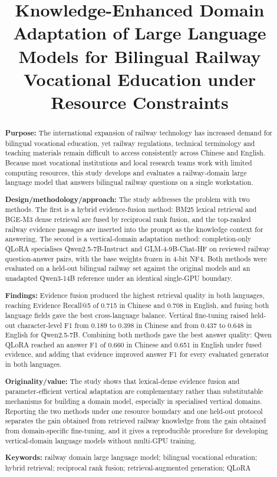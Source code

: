 \documentclass{article}
\author{}
\title{Knowledge-Enhanced Domain Adaptation of Large Language Models for Bilingual Railway Vocational Education under Resource Constraints}
\date{}
\begin{document}
\maketitle

\providecommand{\tightlist}{%
  \setlength{\itemsep}{0pt}\setlength{\parskip}{0pt}}

\begin{abstract}

\textbf{Purpose:} The international expansion of railway technology has increased demand for bilingual vocational education, yet railway regulations, technical terminology and teaching materials remain difficult to access consistently across Chinese and English. Because most vocational institutions and local research teams work with limited computing resources, this study develops and evaluates a railway-domain large language model that answers bilingual railway questions on a single workstation.

\textbf{Design/methodology/approach:} The study addresses the problem with two methods. The first is a hybrid evidence-fusion method: BM25 lexical retrieval and BGE-M3 dense retrieval are fused by reciprocal rank fusion, and the top-ranked railway evidence passages are inserted into the prompt as the knowledge context for answering. The second is a vertical-domain adaptation method: completion-only QLoRA specialises Qwen2.5-7B-Instruct and GLM-4-9B-Chat-HF on reviewed railway question-answer pairs, with the base weights frozen in 4-bit NF4. Both methods were evaluated on a held-out bilingual railway set against the original models and an unadapted Qwen3-14B reference under an identical single-GPU boundary.

\textbf{Findings:} Evidence fusion produced the highest retrieval quality in both languages, reaching Evidence Recall@5 of 0.715 in Chinese and 0.708 in English, and fusing both language fields gave the best cross-language balance. Vertical fine-tuning raised held-out character-level F1 from 0.189 to 0.398 in Chinese and from 0.437 to 0.648 in English for Qwen2.5-7B. Combining both methods gave the best answer quality: Qwen QLoRA reached an answer F1 of 0.660 in Chinese and 0.651 in English under fused evidence, and adding that evidence improved answer F1 for every evaluated generator in both languages.

\textbf{Originality/value:} The study shows that lexical-dense evidence fusion and parameter-efficient vertical adaptation are complementary rather than substitutable mechanisms for building a domain model, especially in specialised vertical domains. Reporting the two methods under one resource boundary and one held-out protocol separates the gain obtained from retrieved railway knowledge from the gain obtained from domain-specific fine-tuning, and it gives a reproducible procedure for developing vertical-domain language models without multi-GPU training.

\textbf{Keywords:} railway domain large language model; bilingual vocational education; hybrid retrieval; reciprocal rank fusion; retrieval-augmented generation; QLoRA

\end{abstract}
\end{document}

